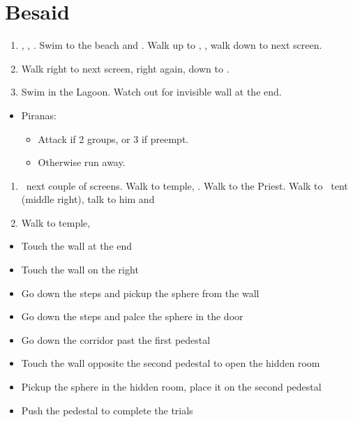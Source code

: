 \chapter{Besaid}

\begin{enumerate}
	\item \cs[0:30], \sd, \fmv. Swim to the beach and \sd. Walk up to \wakka, \sd, walk down to next screen.
	\item Walk right to next screen, right again, down to \wakka.
	\item Swim in the Lagoon. Watch out for invisible wall at the end.
\end{enumerate}
\begin{encounters}
	\begin{itemize}
		\item Piranas:
		\begin{itemize}
			\item Attack if 2 groups, or 3 if preempt.
			\item Otherwise run away.
		\end{itemize}
	\end{itemize}
\end{encounters}
\begin{enumerate}[resume]
	\item \sd\ next couple of screens. Walk to temple, \cs. Walk to the Priest. Walk to \wakka\ tent (middle right), talk to him and \sd
	\item Walk to temple, \sd
\end{enumerate}
\begin{trial}
	\begin{itemize}
		\item Touch the wall at the end
		\item Touch the wall on the right
		\item Go down the steps and pickup the sphere from the wall
		\item Go down the steps and palce the sphere in the door
		\item Go down the corridor past the first pedestal
		\item Touch the wall opposite the second pedestal to open the hidden room
		\item Pickup the sphere in the hidden room, place it on the second pedestal
		\item Push the pedestal to complete the trials
	\end{itemize}
\end{trial}
